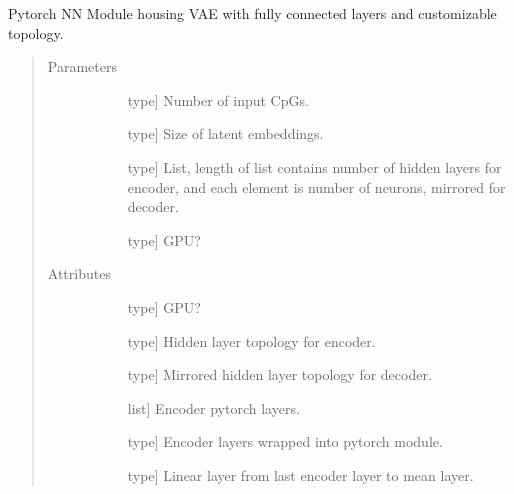 \documentclass[letterpaper,10pt,english]{sphinxmanual}
\begin{document}
\begin{fulllineitems}
\label{\detokenize{index:methylnet.models.TybaltTitusVAE}}
Pytorch NN Module housing VAE with fully connected layers and customizable topology.
\begin{quote}\begin{description}
\item[{Parameters}] \leavevmode\begin{description}
\item[{}] \leavevmode{[}type{]}
Number of input CpGs.

\item[{}] \leavevmode{[}type{]}
Size of latent embeddings.

\item[{}] \leavevmode{[}type{]}
List, length of list contains number of hidden layers for encoder, and each element is number of neurons, mirrored for decoder.

\item[{}] \leavevmode{[}type{]}
GPU?

\end{description}

\item[{Attributes}] \leavevmode\begin{description}
\item[{}] \leavevmode{[}type{]}
GPU?

\item[{}] \leavevmode{[}type{]}
Hidden layer topology for encoder.

\item[{}] \leavevmode{[}type{]}
Mirrored hidden layer topology for decoder.

\item[{}] \leavevmode{[}list{]}
Encoder pytorch layers.

\item[{}] \leavevmode{[}type{]}
Encoder layers wrapped into pytorch module.

\item[{}] \leavevmode{[}type{]}
Linear layer from last encoder layer to mean layer.


\end{description}
\end{description}
\end{quote}
\end{fulllineitems}
\end{document}
